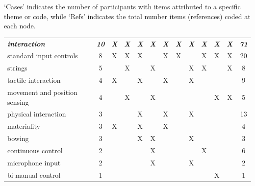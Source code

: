 \documentclass[letterpaper, 12pt]{article}
\begin{document}
\begin{spacing}{1.1}
    \footnotesize
    \noindent`Cases' indicates the number of participants with items attributed to a specific theme or code, while `Refs' indicates the total number items (references) coded at each node.
    \begin{supertabular}{L{5.3cm}cccccccccccc}
        \emph{\textbf{interaction}} & \emph{\textbf{10}} & \emph{\textbf{X}} & \emph{\textbf{X}} & \emph{\textbf{X}} & \emph{\textbf{X}} & \emph{\textbf{X}} & \emph{\textbf{X}} & \emph{\textbf{X}} & \emph{\textbf{X}} & \emph{\textbf{X}} & \emph{\textbf{X}} & \emph{\textbf{71}} \\
        standard input controls          & 8  & X & X & X &   & X & X &   & X & X & X & 20 \\
        strings                          & 5  &   & X &   & X &   &   & X & X &   & X & 8  \\
        tactile interaction              & 4  & X &   & X &   & X &   & X &   &   &   & 9  \\
        movement and position sensing    & 4  &   & X &   & X &   &   &   &   & X & X & 5  \\
        physical interaction             & 3  &   &   & X &   & X &   & X &   &   &   & 13 \\
        materiality                      & 3  & X &   & X &   & X &   &   &   &   &   & 4  \\
        bowing                           & 3  &   &   & X & X &   &   & X &   &   &   & 3  \\
        continuous control               & 2  &   &   &   & X &   &   &   & X &   &   & 6  \\
        microphone input                 & 2  &   &   &   & X &   &   & X &   &   &   & 2  \\
        bi-manual control                & 1  &   &   &   &   &   &   &   &   & X &   & 1  \\
        \hline


\end{supertabular}
\end{spacing}
\end{document}
